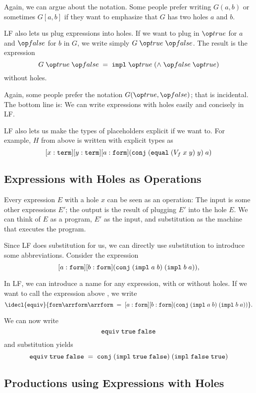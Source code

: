 Again, we can argue about the notation. Some people prefer writing $G(a,b)$ or sometimes $G[a,b]$ if they want to emphasize that $G$ has two holes $a$ and $b$.

LF also lets us plug expressions into holes. If we want to plug in $\true$ for $a$ and $\false$ for $b$ in $G$, we write simply $G\;\true\;\false$. The result is the expression
\[G\;\true\;\false \;=\;\rlname{impl}\;\true\;(\rlname{\wedge}\;\false\;\true)\]
without holes.

Again, some people prefer the notation $G(\true,\false)$; that is incidental. The bottom line is: We can write expressions with holes easily and concisely in LF.
\medskip

LF also lets us make the types of placeholders explicit if we want to. For example, $H$ from above is written with explicit types as
\[[x:\mathtt{term}][y:\mathtt{term}][a:\mathtt{form}](\mathtt{conj}\;(\mathtt{equal}\;(V_f\;x\;y)\;y)\;a)\]

\subsection{Expressions with Holes as Operations}\label{sec:lffe:defs}

Every expression $E$ with a hole $x$ can be seen as an operation: The input is some other expressions $E'$; the output is the result of plugging $E'$ into the hole $E$. We can think of $E$ as a program, $E'$ as the input, and substitution as the machine that executes the program.

Since LF does substitution for us, we can directly use substitution to introduce some abbreviations. Consider the expression \[[a:\mathtt{form}][b:\mathtt{form}](\mathtt{conj}\;(\mathtt{impl}\;a\;b)\;(\mathtt{impl}\;b\;a)),\]

In LF, we can introduce a name for any expression, with or without holes. If we want to call the expression above , we write
\[\idecl{\rlname{equiv}}{\FORM\arr\FORM\arr\FORM \;=\;[a:\FORM][b:\FORM](\rlname{conj}\;(\rlname{impl}\;a\;b)\;(\rlname{impl}\;b\;a))}.\]

We can now write
 \[\mathtt{equiv}\;\mathtt{true}\;\mathtt{false}\]
and substitution yields
  \[\mathtt{equiv}\;\mathtt{true}\;\mathtt{false}\;=\;\mathtt{conj}\;(\mathtt{impl}\;\mathtt{true}\;\mathtt{false})\;(\mathtt{impl}\;\mathtt{false}\;\mathtt{true})\]


\subsection{Productions using Expressions with Holes}

